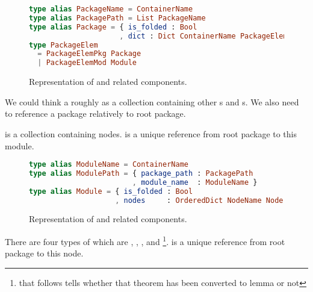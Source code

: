 \documentclass[master.tex]{subfiles}
\begin{document}
\begin{figure}[H]
\begin{framed}
\begin{lstlisting}[language=elm]
type alias PackageName = ContainerName
type alias PackagePath = List PackageName
type alias Package = { is_folded : Bool
                     , dict : Dict ContainerName PackageElem }
type PackageElem
  = PackageElemPkg Package
  | PackageElemMod Module
\end{lstlisting}
\end{framed}
\caption{Representation of  and related components.}
\label{fig:implementation-repo-package}
\end{figure}

We could think a  roughly as a collection containing other
s and s. We also need  to
reference a package relatively to root package.

 is a collection containing nodes.  is a
unique reference from root package to this module.

\begin{figure}[H]
\begin{framed}
\begin{lstlisting}[language=elm]
type alias ModuleName = ContainerName
type alias ModulePath = { package_path : PackagePath
                        , module_name  : ModuleName }
type alias Module = { is_folded : Bool
                    , nodes     : OrderedDict NodeName Node }
\end{lstlisting}
\end{framed}
\caption{Representation of  and related components.}
\label{fig:implementation-repo-module}
\end{figure}

There are four types of  which are , ,
, and \footnote{ that follows
   tells whether that theorem has been converted to lemma or
  not}.  is a unique reference from root package to this
node.
\end{document}
